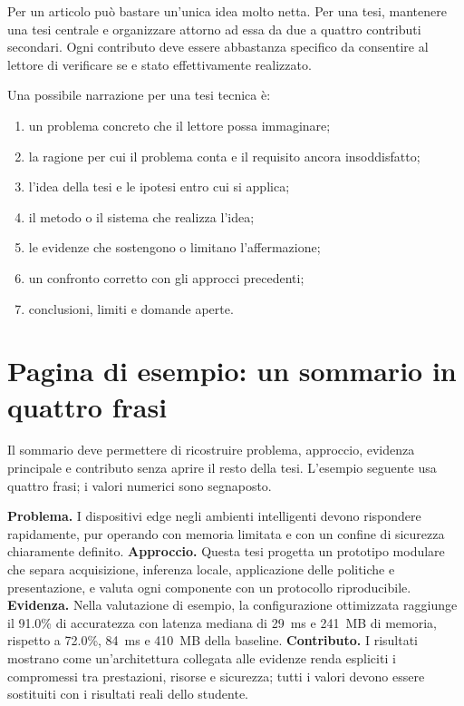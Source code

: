 \begin{keypoint}
Per un articolo può bastare un'unica idea molto netta. Per una tesi, mantenere
una tesi centrale e organizzare attorno ad essa da due a quattro contributi
secondari. Ogni contributo deve essere abbastanza specifico da consentire al
lettore di verificare se e stato effettivamente realizzato.
\end{keypoint}

Una possibile narrazione per una tesi tecnica è:
\begin{enumerate}
  \item un problema concreto che il lettore possa immaginare;
  \item la ragione per cui il problema conta e il requisito ancora insoddisfatto;
  \item l'idea della tesi e le ipotesi entro cui si applica;
  \item il metodo o il sistema che realizza l'idea;
  \item le evidenze che sostengono o limitano l'affermazione;
  \item un confronto corretto con gli approcci precedenti;
  \item conclusioni, limiti e domande aperte.
\end{enumerate}

\section{Pagina di esempio: un sommario in quattro frasi}
Il sommario deve permettere di ricostruire problema, approccio, evidenza
principale e contributo senza aprire il resto della tesi. L'esempio seguente usa
quattro frasi; i valori numerici sono segnaposto.

\begin{frontmatterbox}
\textbf{Problema.} I dispositivi edge negli ambienti intelligenti devono
rispondere rapidamente, pur operando con memoria limitata e con un confine di
sicurezza chiaramente definito. \textbf{Approccio.} Questa tesi progetta un
prototipo modulare che separa acquisizione, inferenza locale, applicazione delle
politiche e presentazione, e valuta ogni componente con un protocollo
riproducibile. \textbf{Evidenza.} Nella valutazione di esempio, la configurazione
ottimizzata raggiunge il 91.0\% di accuratezza con latenza mediana di 29~ms e
241~MB di memoria, rispetto a 72.0\%, 84~ms e 410~MB della baseline.
\textbf{Contributo.} I risultati mostrano come un'architettura collegata alle
evidenze renda espliciti i compromessi tra prestazioni, risorse e sicurezza;
tutti i valori devono essere sostituiti con i risultati reali dello studente.
\end{frontmatterbox}

